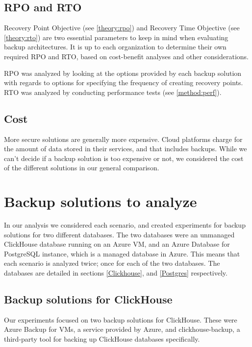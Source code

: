 \subsection{RPO and RTO} \label{method:rtorpo}

Recovery Point Objective (see \ref{theory:rpo}) and Recovery Time Objective (see \ref{theory:rto}) are two essential parameters to keep in mind when evaluating backup architectures. 
It is up to each organization to determine their own required RPO and RTO,
based on cost-benefit analyses and other considerations.

RPO was analyzed by looking at the options provided by each backup solution with regards to options for specifying the frequency of creating recovery points. RTO was analyzed by conducting performance tests (see \ref{method:perf}).

\subsection{Cost}

More secure solutions are generally more expensive. Cloud platforms charge for the amount of data stored in their services, and that includes backups. While we can't decide if a backup solution is too expensive or not, we considered the cost of the different solutions in our general comparison. 

\section{Backup solutions to analyze} \label{BackupSolutions}

In our analysis we considered each scenario, and created experiments for backup solutions for two different databases. The two databases were an unmanaged ClickHouse database running on an Azure VM, and an Azure Database for PostgreSQL instance, which is a managed database in Azure. This means that each scenario is analyzed twice; once for each of the two databases. The databases are detailed in sections \ref{Clickhouse}, and \ref{Postgres} respectively.

\subsection{Backup solutions for ClickHouse}

Our experiments focused on two backup solutions for ClickHouse. 
These were Azure Backup for VMs, a service provided by Azure, and clickhouse-backup, a third-party tool for backing up ClickHouse databases specifically.

